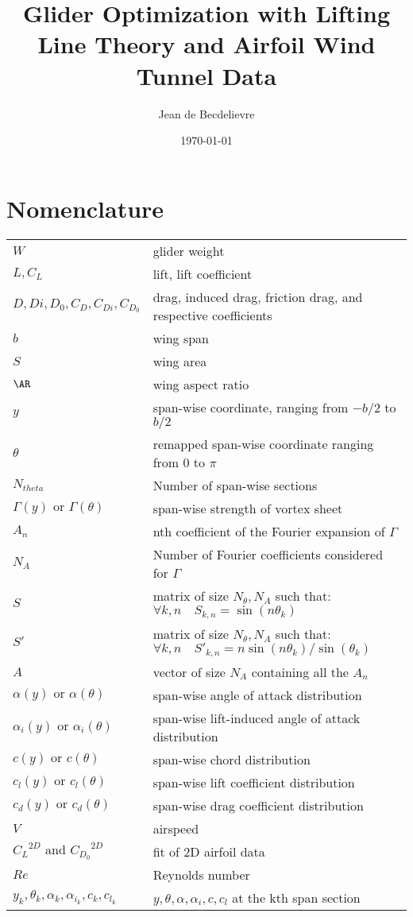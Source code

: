 \documentclass[letterpaper,12pt]{article}
\begin{document}
\title{Glider Optimization with Lifting Line Theory and Airfoil Wind Tunnel Data}
\author{Jean de Becdelievre}
\date{\today}
\maketitle

\section{Nomenclature}

{\renewcommand\arraystretch{1.0}
\noindent\begin{longtable}{@{}l @{\quad : \quad} l@{}}
$W$  & glider weight \\
$L, C_L$ & lift, lift coefficient \\
$D,Di,D_0, C_D,C_{Di},C_{D_0}$& drag, induced drag, friction drag, and respective coefficients \\
$b$ & wing span \\
$S$ & wing area \\
$\AR$ & wing aspect ratio \\
$y$ & span-wise coordinate, ranging from $-b/2$ to $b/2$ \\
$\theta$ & remapped span-wise coordinate ranging from $0$ to $\pi$ \\
$N_{theta}$ & Number of span-wise sections \\
$\Gamma(y) \text{ or } \Gamma(\theta)$ & span-wise strength of vortex sheet\\
$A_n$ & nth coefficient of the Fourier expansion of $\Gamma$ \\
$N_{A}$ & Number of Fourier coefficients considered for $\Gamma$ \\
$S$ & matrix of size $N_{\theta}, N_A$ such that: $ \forall k,n \quad S_{k,n} = \sin(n\theta_k)$ \\
$S'$ & matrix of size $N_{\theta}, N_A$ such that: $ \forall k,n \quad {S'}_{k,n} = n\sin(n\theta_k)/\sin(\theta_k)$ \\
$A$ & vector of size $N_A$ containing all the $A_n$ \\
$\alpha(y) \text{ or } \alpha(\theta)$ & span-wise angle of attack distribution\\
$\alpha_i(y) \text{ or } \alpha_i(\theta)$ & span-wise lift-induced angle of attack distribution\\
$c(y) \text{ or } c(\theta)$ & span-wise chord distribution\\
$c_l(y) \text{ or } c_l(\theta)$ & span-wise lift coefficient distribution\\
$c_d(y) \text{ or } c_d(\theta)$ & span-wise drag coefficient distribution\\
$V$ & airspeed \\
${C_L}^{2D} \text{ and } {C_{D_0}}^{2D}$ & fit of 2D airfoil data \\
$Re$ & Reynolds number \\
$y_k, \theta_k, \alpha_k, \alpha_{i_k}, c_k, c_{l_k}$ &  $y, \theta, \alpha, \alpha_i, c, c_{l}$ at the kth span section\\
\end{longtable}}
\end{document}
